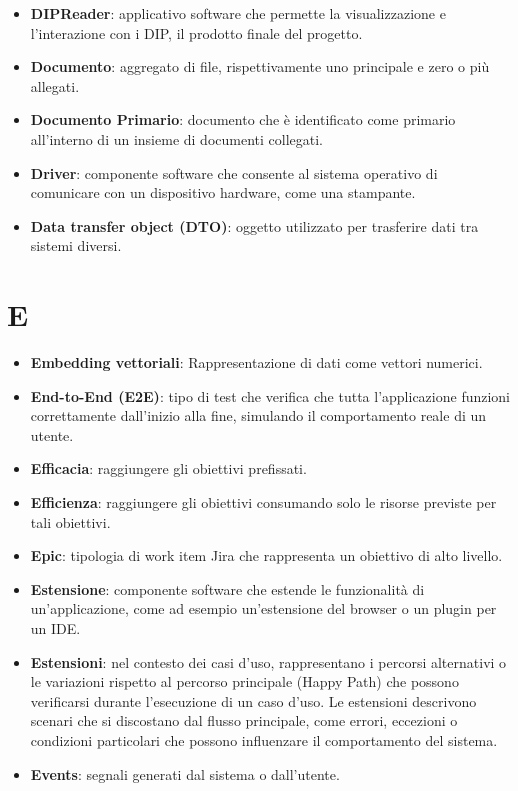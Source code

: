 \documentclass[a4paper,12pt]{article}
\begin{document}
\begin{itemize}
    \item \textbf{DIPReader}: applicativo software che permette la visualizzazione e l'interazione con i DIP, il prodotto finale del progetto.
    \item \textbf{Documento}: aggregato di file, rispettivamente uno principale e zero o più allegati.
    \item \textbf{Documento Primario}: documento che è identificato come primario all'interno di un insieme di documenti collegati.
    \item \textbf{Driver}: componente software che consente al sistema operativo di comunicare con un dispositivo hardware, come una stampante.
    \item \textbf{Data transfer object (DTO)}: oggetto utilizzato per trasferire dati tra sistemi diversi.
\end{itemize}
\section{E}
\begin{itemize}
    \item \textbf{Embedding vettoriali}: Rappresentazione di dati come vettori numerici.
    \item \textbf{End-to-End (E2E)}: tipo di test che verifica che tutta l’applicazione funzioni correttamente dall’inizio alla fine, simulando il comportamento reale di un utente.
    \item \textbf{Efficacia}: raggiungere gli obiettivi prefissati.
    \item \textbf{Efficienza}: raggiungere gli obiettivi consumando solo le risorse previste per tali obiettivi.
    \item \textbf{Epic}: tipologia di work item Jira che rappresenta un obiettivo di alto livello.
    \item \textbf{Estensione}: componente software che estende le funzionalità di un'applicazione, come ad esempio un'estensione del browser o un plugin per un IDE.
    \item \textbf{Estensioni}: nel contesto dei casi d'uso, rappresentano i percorsi alternativi o le variazioni rispetto al percorso principale (Happy Path) che possono verificarsi durante l'esecuzione di un caso d'uso. Le estensioni descrivono scenari che si discostano dal flusso principale, come errori, eccezioni o condizioni particolari che possono influenzare il comportamento del sistema.
    \item \textbf{Events}: segnali generati dal sistema o dall'utente.
\end{itemize}
\end{document}
